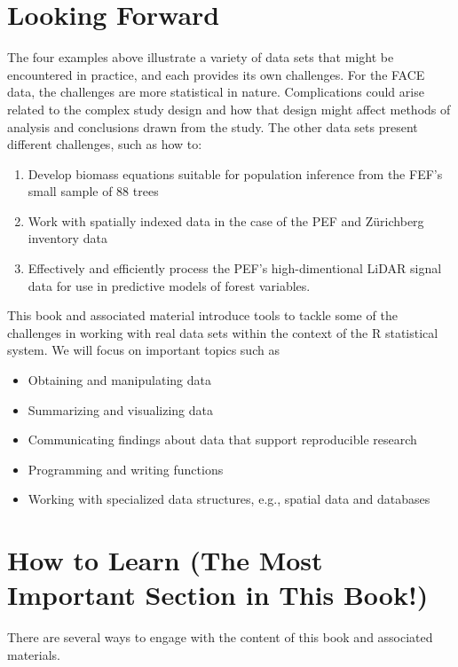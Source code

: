 \documentclass[]{krantz}
\providecommand{\tightlist}{%
  \setlength{\itemsep}{0pt}\setlength{\parskip}{0pt}}
\theoremstyle{definition}
\theoremstyle{definition}
\theoremstyle{definition}
\theoremstyle{remark}
\begin{document}
\section{Looking Forward}\label{looking-forward}

The four examples above illustrate a variety of data sets that might be
encountered in practice, and each provides its own challenges. For the
FACE data, the challenges are more statistical in nature. Complications
could arise related to the complex study design and how that design
might affect methods of analysis and conclusions drawn from the study.
The other data sets present different challenges, such as how to:

\begin{enumerate}
\def\labelenumi{\arabic{enumi}.}
\tightlist
\item
  Develop biomass equations suitable for population inference from the
  FEF's small sample of 88 trees
\item
  Work with spatially indexed data in the case of the PEF and Zürichberg
  inventory data
\item
  Effectively and efficiently process the PEF's high-dimentional LiDAR
  signal data for use in predictive models of forest variables.
\end{enumerate}

This book and associated material introduce tools to tackle some of the
challenges in working with real data sets within the context of the R
statistical system. We will focus on important topics such as

\begin{itemize}
\tightlist
\item
  Obtaining and manipulating data
\item
  Summarizing and visualizing data
\item
  Communicating findings about data that support reproducible research
\item
  Programming and writing functions
\item
  Working with specialized data structures, e.g., spatial data and
  databases
\end{itemize}

\section{How to Learn (The Most Important Section in This
Book!)}\label{how-to-learn-the-most-important-section-in-this-book}

There are several ways to engage with the content of this book and
associated materials.
\end{document}
